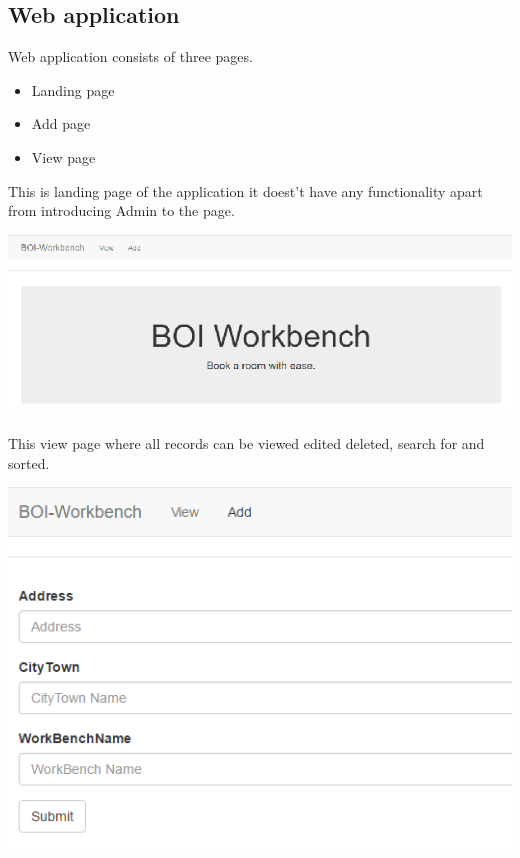 \begin{itemize}
\subsection{Web application}

Web application consists of three pages. 

\begin{itemize}
	\item Landing page
	\item Add page
	\item View page 
\end{itemize}
\pagebreak
This is landing page of the application it doest’t have any functionality apart from introducing Admin to the page.
\begin{center}    
	\includegraphics{img/AdminLanding.png}
\end{center}

This view page where all records can be viewed edited deleted, search for and sorted.
\begin{center}    
	\includegraphics{img/AdminAdd.png}
\end{center}


\end{itemize}
